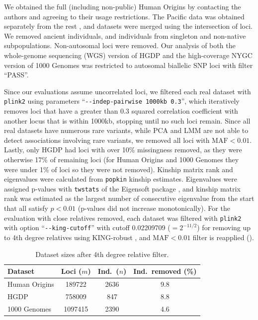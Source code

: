 \documentclass[9pt,lineno]{elife}
\begin{document}
We obtained the full (including non-public) Human Origins by contacting the authors and agreeing to their usage restrictions.
The Pacific data \citep{skoglund_genomic_2016} was obtained separately from the rest \citep{lazaridis_ancient_2014,lazaridis_genomic_2016}, and datasets were merged using the intersection of loci.
We removed ancient individuals, and individuals from singleton and non-native subpopulations.
Non-autosomal loci were removed.
Our analysis of both the whole-genome sequencing (WGS) version of HGDP \citep{bergstrom_insights_2020} and the high-coverage NYGC version of 1000 Genomes \citep{fairley_international_2020} was restricted to autosomal biallelic SNP loci with filter ``PASS''.

Since our evaluations assume uncorrelated loci, we filtered each real dataset with \texttt{plink2} using parameters ``\texttt{-{}-indep-pairwise 1000kb 0.3}'', which iteratively removes loci that have a greater than 0.3 squared correlation coefficient with another locus that is within 1000kb, stopping until no such loci remain.
Since all real datasets have numerous rare variants, while PCA and LMM are not able to detect associations involving rare variants, we removed all loci with $\text{MAF} < 0.01$.
Lastly, only HGDP had loci with over 10\% missingness removed, as they were otherwise 17\% of remaining loci (for Human Origins and 1000 Genomes they were under 1\% of loci so they were not removed).
Kinship matrix rank and eigenvalues were calculated from \texttt{popkin} kinship estimates.
Eigenvalues were assigned p-values with \texttt{twstats} of the Eigensoft package \citep{patterson_population_2006}, and kinship matrix rank was estimated as the largest number of consecutive eigenvalue from the start that all satisfy $p < 0.01$ (p-values did not increase monotonically).
For the evaluation with close relatives removed, each dataset was filtered with \texttt{plink2} with option ``\texttt{-{}-king-cutoff}'' with cutoff 0.02209709 ($= 2^{-11/2}$) for removing up to 4th degree relatives using KING-robust \citep{manichaikul_robust_2010}, and $\text{MAF} < 0.01$ filter is reapplied ().

\begin{table}[bt]
  \caption{Dataset sizes after 4th degree relative filter.}
  \label{tab:king_cutoff}
  \begin{tabular}{lSSS}
    \toprule
    Dataset & {Loci ($m$)} & {Ind.~($n$)} & {Ind.~removed (\%)} \\
    \midrule
    Human Origins	&189722		&2636	&9.8 \\
    HGDP		&758009		&847	&8.8 \\
    1000 Genomes	&1097415	&2390	&4.6 \\
    \bottomrule
  \end{tabular}
\end{table}
\end{document}
